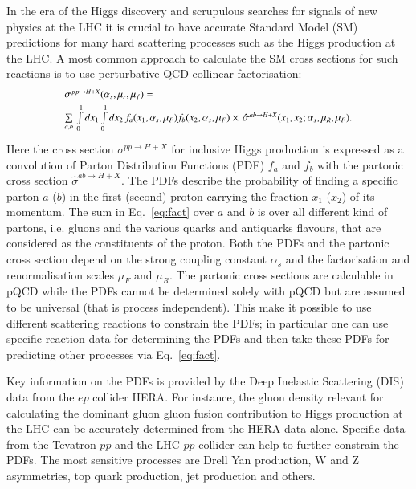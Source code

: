 In the era of the Higgs discovery and scrupulous searches
for signals of new physics at the LHC it is crucial
to have accurate Standard Model (SM) predictions for
many hard scattering processes such as the Higgs production at the LHC.
A most common approach to calculate the SM cross sections for  
such reactions is to use perturbative QCD collinear factorisation:
\begin{equation}
\small
\begin{array}{l}
\sigma^{pp\rightarrow H + X}(\alpha_s,\mu_r,\mu_f) = \\[1mm] 
\sum\limits_{a,b}\,  \int\limits_{0}\limits^{1} dx_1 \int\limits_{0}\limits^{1} dx_2\, f_a(x_1,\alpha_s,\mu_F) 
 f_b(x_2,\alpha_s,\mu_F) 
\times \, \hat{\sigma}^{ab \rightarrow H + X}(x_1,x_2;\alpha_s,\mu_R,\mu_F).\\[3mm]
\end{array}
\label{eq:fact}
\end{equation}
Here the cross section $\sigma^{pp\rightarrow H + X}$ for inclusive
Higgs production is expressed
as a convolution of Parton Distribution Functions (PDF) $f_a$ and $f_b$
with the partonic cross section
$\hat{\sigma}^{ab \rightarrow H + X}$.
%
The PDFs describe 
the probability of finding a specific parton $a$ ($b$) in the first (second) proton
carrying the fraction $x_1$ ($x_2$) of its momentum.
%
The sum in Eq.~\ref{eq:fact} over $a$ and $b$ is over all different kind of partons,
i.e. gluons and the various quarks and antiquarks flavours, that are considered
as the constituents of the proton.
%
Both the PDFs and the partonic cross section depend on the strong coupling
constant $\alpha_s$ and the factorisation and renormalisation scales
$\mu_F$ and $\mu_R$.
%
The partonic cross sections are calculable in pQCD while
the PDFs cannot be determined solely with pQCD but are assumed 
to be universal (that is process independent).
%
This make it possible to use different scattering reactions 
to constrain the PDFs; in particular one can use specific reaction data 
for determining the PDFs and then take these PDFs for
predicting other processes via Eq.~\ref{eq:fact}.
%

Key information on the PDFs is provided by the Deep Inelastic Scattering (DIS) data 
from the $ep$ collider HERA.
%
For instance, the gluon density relevant
for calculating the dominant gluon gluon fusion contribution to Higgs production
at the LHC can be accurately determined from the HERA data alone.
%
Specific data from the Tevatron $p\bar{p}$ and the LHC $pp$ collider
can help to further constrain the PDFs.
%
The most sensitive processes are
Drell Yan production, W and Z asymmetries, top quark production, jet production
and  others.
%

